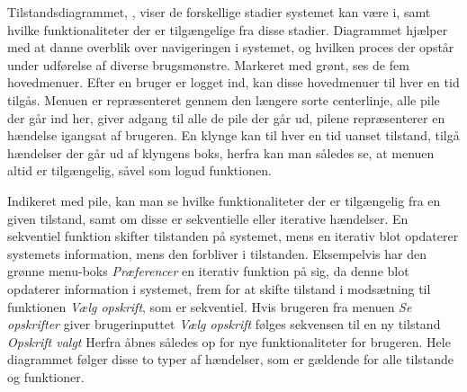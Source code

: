 Tilstandsdiagrammet, , viser de forskellige stadier systemet kan være i, samt hvilke funktionaliteter der er tilgængelige fra disse stadier.
Diagrammet hjælper med at danne overblik over navigeringen i systemet, og hvilken proces der opstår under udførelse af diverse brugsmønstre.
Markeret med grønt, ses de fem hovedmenuer.
Efter en bruger er logget ind, kan disse hovedmenuer til hver en tid tilgås.
Menuen er repræsenteret gennem den længere sorte centerlinje,  alle pile der går ind her, giver adgang til alle de pile der går ud, pilene repræsenterer en hændelse igangsat af brugeren.
En klynge kan til hver en tid uanset tilstand, tilgå hændelser der går ud af klyngens boks, herfra kan man således se, at menuen altid er tilgængelig, såvel som logud funktionen.

Indikeret med pile, kan man se hvilke funktionaliteter der er tilgængelig fra en given tilstand, samt om disse er sekventielle eller iterative hændelser.
En sekventiel funktion skifter tilstanden på systemet, mens en iterativ blot opdaterer systemets information, mens den forbliver i tilstanden.
Eksempelvis har den grønne menu-boks \textit{Præferencer} en iterativ funktion på sig, da denne blot opdaterer information i systemet, frem for at skifte tilstand i modsætning til funktionen \textit{Vælg opskrift}, som er sekventiel.
Hvis brugeren fra menuen \textit{Se opskrifter} giver brugerinputtet \textit{Vælg opskrift} følges sekvensen til en ny tilstand \textit{Opskrift valgt} Herfra åbnes således op for nye funktionaliteter for brugeren.
Hele diagrammet følger disse to typer af hændelser, som er gældende for alle tilstande og funktioner.

